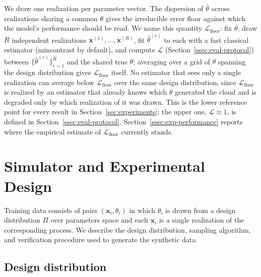 \documentclass[11pt,letterpaper]{article}
\newcommand{\1}{\mathds{1}}
\newcommand{\pc}{\mathbf{x}}
\theoremstyle{plain}
\theoremstyle{definitioncolon}
\begin{document}
We draw one realization per parameter vector. The dispersion of $\hat\theta$
across realizations sharing a common $\theta$ gives the irreducible error floor
against which the model's performance should be read. We name this quantity
$\mathcal{L}_{\text{floor}}$: fix $\theta$, draw $R$ independent realizations
$\pc^{(1)}, \dots, \pc^{(R)}$, fit $\hat\theta^{(r)}$ to each with a fast
classical estimator (mincontrast by default), and compute $\mathcal{L}$
(Section~\ref{ssec:eval-protocol}) between $\{\hat\theta^{(r)}\}_{r=1}^R$ and
the shared true $\theta$; averaging over a grid of $\theta$ spanning the
design distribution gives $\mathcal{L}_{\text{floor}}$ itself. No estimator
that sees only a single realization can average below
$\mathcal{L}_{\text{floor}}$ over the same design distribution, since
$\mathcal{L}_{\text{floor}}$ is realized by an estimator that already knows
which $\theta$ generated the cloud and is degraded only by which realization
of it was drawn. This is the lower reference point for every result in
Section~\ref{sec:experiments}; the upper one, $\mathcal{L}\approx1$, is
defined in Section~\ref{ssec:eval-protocol}. Section~\ref{ssec:exp-performance}
reports where the empirical estimate of $\mathcal{L}_{\text{floor}}$
currently stands.


\section{Simulator and Experimental Design}
\label{sec:simulator}

Training data consists of pairs $(\pc_i, \theta_i)$ in which $\theta_i$ is drawn
from a design distribution $\Pi$ over parameters space and each $\pc_i$ is a
single realization of the corresponding process. We describe the design
distribution, sampling algorithm, and verification procedure used to generate
the synthetic data.

\subsection{Design distribution}
\end{document}
